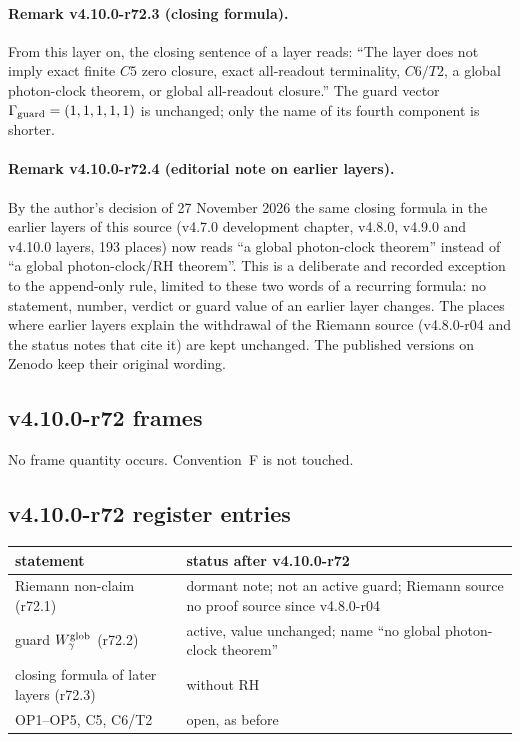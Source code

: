 \paragraph{Remark v4.10.0-r72.3 (closing formula).}
From this layer on, the closing sentence of a layer reads: ``The layer does not imply exact finite \(C5\) zero closure, exact
all-readout terminality, \(C6/T2\), a global photon-clock theorem, or global all-readout closure.''  The guard vector
\(\Gamma_{\rm guard}=(1,1,1,1,1)\) is unchanged; only the name of its fourth component is shorter.

\paragraph{Remark v4.10.0-r72.4 (editorial note on earlier layers).}
By the author's decision of 27 November 2026 the same closing formula in the earlier layers of this source (v4.7.0 development
chapter, v4.8.0, v4.9.0 and v4.10.0 layers, 193 places) now reads ``a global photon-clock theorem'' instead of ``a global
photon-clock/RH theorem''.  This is a deliberate and recorded exception to the append-only rule, limited to these two words of a
recurring formula: no statement, number, verdict or guard value of an earlier layer changes.  The places where earlier layers
explain the withdrawal of the Riemann source (v4.8.0-r04 and the status notes that cite it) are kept unchanged.  The published
versions on Zenodo keep their original wording.

\subsection*{v4.10.0-r72 frames}
\label{subsec:v4100-r72-frames}

No frame quantity occurs.  Convention~F is not touched.

\subsection*{v4.10.0-r72 register entries}
\label{subsec:v4100-r72-register}

\begin{center}
\small
\begin{tabular}{@{}>{\raggedright\arraybackslash}p{}>{\raggedright\arraybackslash}p{}@{}}
\toprule
statement & status after v4.10.0-r72\\
\midrule
Riemann non-claim (r72.1) & dormant note; not an active guard; Riemann source no proof source since v4.8.0-r04\\
guard \(W_\gamma^{\rm glob}\) (r72.2) & active, value unchanged; name ``no global photon-clock theorem''\\
closing formula of later layers (r72.3) & without RH\\
OP1--OP5, C5, C6/T2 & open, as before\\
\bottomrule
\end{tabular}
\end{center}

